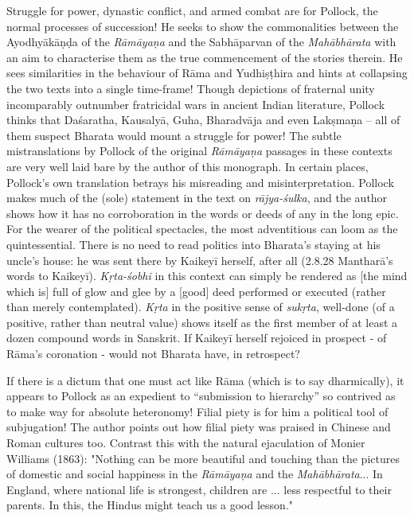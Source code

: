 Struggle for power, dynastic conflict, and armed combat are for Pollock, the normal processes of succession! He seeks to show the commonalities between the Ayodhyākāṇḍa of the {\sl Rāmāyaṇa} and the Sabhāparvan of the {\sl Mahābhārata} with an aim to characterise them as the true commencement of the stories therein. He sees similarities in the behaviour of Rāma and Yudhiṣṭhira and hints at collapsing the two texts into a single time-frame! Though depictions of fraternal unity incomparably outnumber fratricidal wars in ancient Indian literature, Pollock thinks that Daśaratha, Kausalyā, Guha, Bharadvāja and even Lakṣmaṇa -- all of them suspect Bharata would mount a struggle for power! The subtle mistranslations by Pollock of the original {\sl Rāmāyaṇa} passages in these contexts are very well laid bare by the author of this monograph. In certain places, Pollock's own translation betrays his misreading and misinterpretation. Pollock makes much of the (sole) statement in the text on {\sl rājya-śulka}, and the author shows how it has no corroboration in the words or deeds of any in the long epic. For the wearer of the political spectacles, the most adventitious can loom as the quintessential. There is no need to read politics into Bharata's staying at his uncle's house: he was sent there by Kaikeyī herself, after all (2.8.28 Mantharā's words to Kaikeyī). {\sl Kṛta-śobhi} in this context can simply be rendered as [the mind which is] full of glow and glee by a [good] deed performed or executed (rather than merely contemplated). {\sl Kṛta} in the positive sense of {\sl sukṛta}, well-done (of a positive, rather than neutral value) shows itself as the first member of at least a dozen compound words in Sanskrit. If Kaikeyī herself rejoiced in prospect - of Rāma's coronation - would not Bharata have, in retrospect?

If there is a dictum that one must act like Rāma (which is to say dharmically), it appears to Pollock as an expedient to “submission to hierarchy” so contrived as to make way for absolute heteronomy! Filial piety is for him a political tool of subjugation! The author points out how filial piety was praised in Chinese and Roman cultures too. Contrast this with the natural ejaculation of Monier Williams (1863): "Nothing can be more beautiful and touching than the pictures of domestic and social happiness in the {\sl Rāmāyaṇa} and the {\sl Mahābhārata}... In England, where national life is strongest, children are ... less respectful to their parents. In this, the Hindus might teach us a good lesson."

